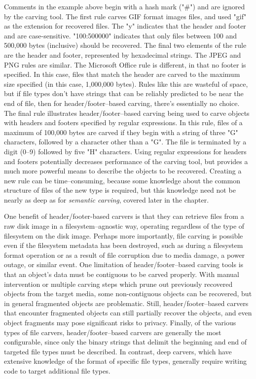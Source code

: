 Comments in the example above begin with a hash mark ("\#") and are ignored by the carving tool.  The first rule carves GIF format images files, and used "gif" as the extension for recovered files.  The "y" indicates that the header and footer and are case-sensitive.  "100:500000" indicates that only files between 100 and 500,000 bytes (inclusive) should be recovered.  The final two elements of the rule are the header and footer, represented by hexadecimal strings.  The JPEG and PNG rules are similar.  The Microsoft Office rule is different, in that no footer is specified.  In this case, files that match the header are carved to the maximum size specified (in this case, 1,000,000 bytes).  Rules like this are wasteful of space, but if file types don't have strings that can be reliably predicted to be near the end of file, then for header/footer--based carving, there's essentially no choice.  The final rule illustrates header/footer--based carving being used to carve objects with headers and footers specified by regular expressions.  In this rule, files of a maximum of 100,000 bytes are carved if they begin with a string of three "G" characters, followed by a character other than a "G".   The file is terminated by a digit (0--9) followed by five "H" characters.  Using regular expressions for headers and footers potentially decreases performance of the carving tool, but provides a much more powerful means to describe the objects to be recovered.  Creating a new rule can be time--consuming, because some knowledge about the common structure of files of the new type is required, but this knowledge need not be nearly as deep as for \emph{semantic carving}, covered later in the chapter.

One benefit of header/footer-based carvers is that they can retrieve files from a raw disk image in a filesystem--agnostic way, operating regardless of the type of filesystem on the disk image.  Perhaps more importantly, file carving is possible even if the filesystem metadata has been destroyed, such as during a filesystem format operation or as a result of file corruption due to media damage, a power outage, or similar event.    One limitation of header/footer--based carving tools is that an object's data must be contiguous to be carved properly.  With manual intervention or multiple carving steps which prune out previously recovered objects from the target media, some non-contiguous objects can be recovered, but in general fragmented objects are problematic.  Still, header/footer--based carvers that encounter fragmented objects can still partially recover the objects, and even object fragments may pose significant risks to privacy.  Finally, of the various types of file carvers, header/footer--based carvers are generally the most configurable, since only the binary strings that delimit the beginning and end of targeted file types must be described.  In contrast, deep carvers, which have extensive knowledge of the format of specific file types, generally require writing code to target additional file types.

